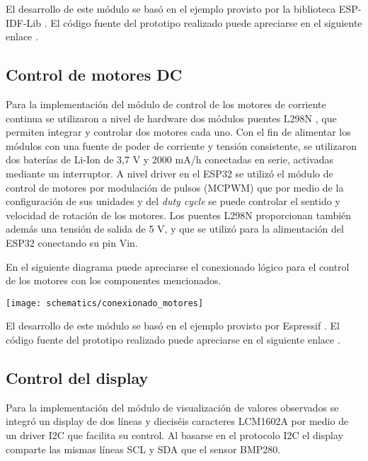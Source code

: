 El desarrollo de este módulo se basó en el ejemplo provisto por la biblioteca ESP-IDF-Lib \cite{ESP32_bmp280_example}. El código fuente del prototipo realizado puede apreciarse en el siguiente enlace \cite{ESP32_POC_bmp280}.


\subsection{Control de motores DC}

Para la implementación del módulo de control de los motores de corriente continua se utilizaron a nivel de hardware dos módulos puentes L298N \cite{L298N}, que permiten integrar y controlar dos motores cada uno. Con el fin de alimentar los módulos con una fuente de poder de corriente y tensión consistente, se utilizaron dos baterías de Li-Ion de 3,7 V y 2000 mA/h conectadas en serie, activadas mediante un interruptor.
A nivel driver en el ESP32 se utilizó el módulo de control de motores por modulación de pulsos (MCPWM) \cite{ESP32_MCPWM} que por medio de la configuración de sus unidades y del \textit{duty cycle} \cite{ESP32_MCPWM_2} se puede controlar el sentido y velocidad de rotación de los motores.
Los puentes L298N proporcionan también además una tensión de salida de 5 V, y que se utilizó para la alimentación del ESP32 conectando su pin Vin.

En el siguiente diagrama puede apreciarse el conexionado lógico para el control de los motores con los componentes mencionados.

\begin{center}
\texttt{[image: schematics/conexionado\_motores]}
  \label{fig:conexionado_motores}
\end{center}

El desarrollo de este módulo se basó en el ejemplo provisto por Espressif \cite{ESP32_MCPWM_example}. El código fuente del prototipo realizado puede apreciarse en el siguiente enlace \cite{ESP32_POC_motor_MCPWM}.



\subsection{Control del display}

Para la implementación del módulo de visualización de valores observados se integró un display de dos líneas y dieciséis caracteres LCM1602A por medio de un driver I2C que facilita su control. Al basarse en el protocolo I2C el display comparte las mismas líneas SCL y SDA que el sensor BMP280.

